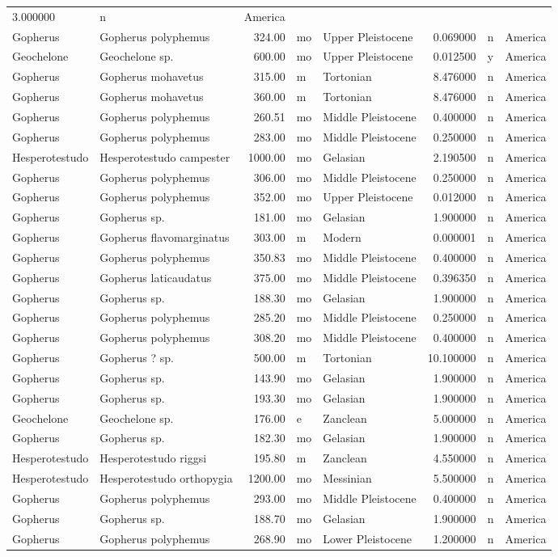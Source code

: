 \documentclass[]{article}
\begin{document}
\begin{longtable}[]{@{}llrllrll@{}}
3.000000 & n & America\tabularnewline
Gopherus & Gopherus polyphemus & 324.00 & mo & Upper Pleistocene &
0.069000 & n & America\tabularnewline
Geochelone & Geochelone sp. & 600.00 & mo & Upper Pleistocene & 0.012500
& y & America\tabularnewline
Gopherus & Gopherus mohavetus & 315.00 & m & Tortonian & 8.476000 & n &
America\tabularnewline
Gopherus & Gopherus mohavetus & 360.00 & m & Tortonian & 8.476000 & n &
America\tabularnewline
Gopherus & Gopherus polyphemus & 260.51 & mo & Middle Pleistocene &
0.400000 & n & America\tabularnewline
Gopherus & Gopherus polyphemus & 283.00 & mo & Middle Pleistocene &
0.250000 & n & America\tabularnewline
Hesperotestudo & Hesperotestudo campester & 1000.00 & mo & Gelasian &
2.190500 & n & America\tabularnewline
Gopherus & Gopherus polyphemus & 306.00 & mo & Middle Pleistocene &
0.250000 & n & America\tabularnewline
Gopherus & Gopherus polyphemus & 352.00 & mo & Upper Pleistocene &
0.012000 & n & America\tabularnewline
Gopherus & Gopherus sp. & 181.00 & mo & Gelasian & 1.900000 & n &
America\tabularnewline
Gopherus & Gopherus flavomarginatus & 303.00 & m & Modern & 0.000001 & n
& America\tabularnewline
Gopherus & Gopherus polyphemus & 350.83 & mo & Middle Pleistocene &
0.400000 & n & America\tabularnewline
Gopherus & Gopherus laticaudatus & 375.00 & mo & Middle Pleistocene &
0.396350 & n & America\tabularnewline
Gopherus & Gopherus sp. & 188.30 & mo & Gelasian & 1.900000 & n &
America\tabularnewline
Gopherus & Gopherus polyphemus & 285.20 & mo & Middle Pleistocene &
0.250000 & n & America\tabularnewline
Gopherus & Gopherus polyphemus & 308.20 & mo & Middle Pleistocene &
0.400000 & n & America\tabularnewline
Gopherus & Gopherus ? sp. & 500.00 & m & Tortonian & 10.100000 & n &
America\tabularnewline
Gopherus & Gopherus sp. & 143.90 & mo & Gelasian & 1.900000 & n &
America\tabularnewline
Gopherus & Gopherus sp. & 193.30 & mo & Gelasian & 1.900000 & n &
America\tabularnewline
Geochelone & Geochelone sp. & 176.00 & e & Zanclean & 5.000000 & n &
America\tabularnewline
Gopherus & Gopherus sp. & 182.30 & mo & Gelasian & 1.900000 & n &
America\tabularnewline
Hesperotestudo & Hesperotestudo riggsi & 195.80 & m & Zanclean &
4.550000 & n & America\tabularnewline
Hesperotestudo & Hesperotestudo orthopygia & 1200.00 & mo & Messinian &
5.500000 & n & America\tabularnewline
Gopherus & Gopherus polyphemus & 293.00 & mo & Middle Pleistocene &
0.400000 & n & America\tabularnewline
Gopherus & Gopherus sp. & 188.70 & mo & Gelasian & 1.900000 & n &
America\tabularnewline
Gopherus & Gopherus polyphemus & 268.90 & mo & Lower Pleistocene &
1.200000 & n & America\tabularnewline

\end{longtable}
\end{document}
